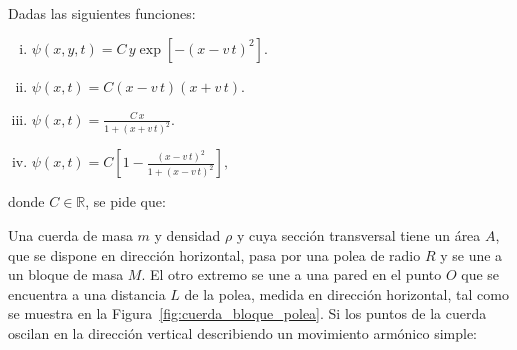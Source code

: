 \documentclass[addpoints]{exam}
\newcommand{\rr}{\mathbb{R}}
\begin{document}
\begin{questions}

    \question Dadas las siguientes funciones:
    \begin{enumerate}[i)]
        \item $\psi \left(x,y,t\right) = C \, y \exp \left[- \left(x-v \, t\right)^2\right].$
        \item $\psi \left(x,t\right) = C \left(x-v\,t\right) \left(x+v\,t\right).$
        \item $\psi \left(x,t\right) = \frac{C \, x}{1 + \left(x + v \, t\right)^2}.$
        \item $\psi \left(x,t\right) = C \left[1 - \frac{\left(x - v \, t\right)^2}{1 + \left(x - v \, t\right)^2}\right],$
    \end{enumerate} donde $C \in \rr$, se pide que:

    \question Una cuerda de masa $m$ y densidad $\rho$ y cuya sección transversal tiene un área $A$, que se dispone en dirección horizontal, pasa por una polea de radio $R$ y se une a un bloque de masa $M$. El otro extremo se une a una pared en el punto $O$ que se encuentra a una distancia $L$ de la polea, medida en dirección horizontal, tal como se muestra en la Figura~\ref{fig:cuerda_bloque_polea}. Si los puntos de la cuerda oscilan en la dirección vertical describiendo un movimiento armónico simple: \label{ej:cuerda_bloque_polea}
\end{questions}
\end{document}
